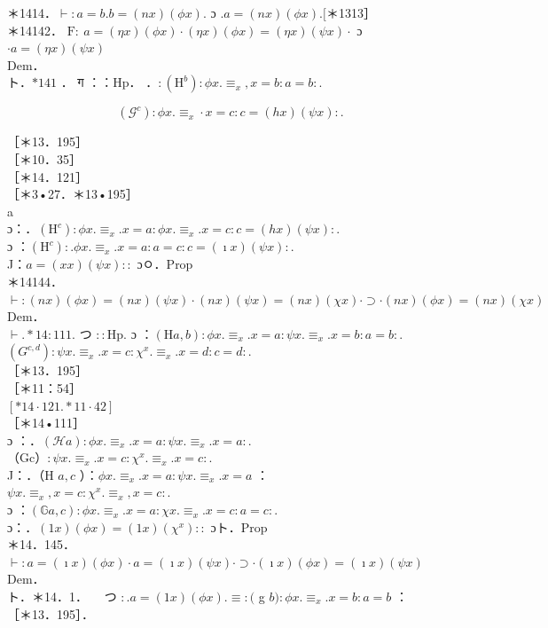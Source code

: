 \documentclass[10pt]{article}
\begin{document}
＊1414．$\vdash: a=b . b=(n x)(\phi x)$. ɔ $. a=(n x)(\phi x) .[$＊1313］\\
＊14142． $\mathrm{F}: ~ a=(\eta x)(\phi x) \cdot(\eta x)(\phi x)=(\eta x)(\psi x) \cdot$ ɔ $\cdot a=(\eta x)(\psi x)$\\
Dem．\\
ト．$* 141$ ． ग ：：Hp． ．$:\left(\mathrm{H}^{b}\right): \phi x . \equiv_{x}, x=b: a=b:$.

$$
\left(\mathcal{G}^{c}\right): \phi x . \equiv_{x} \cdot x=c: c=(h x)(\psi x): .
$$

［＊13．195］\\
［＊10．35］\\
［＊14．121］\\
［＊3•27．＊13•195］\\
a\\
ɔ：．$\left(\mathrm{H}^{c}\right): \phi x . \equiv_{x} . x=a: \phi x . \equiv_{x} . x=c: c=(h x)(\psi x):$.\\
ɔ ：$\left(\mathrm{H}^{c}\right): . \phi x . \equiv_{x} . x=a: a=c: c=(\imath x)(\psi x):$.\\
J：$a=(x x)(\psi x)::$ ɔㅇ．Prop\\
＊14144．$\vdash:(n x)(\phi x)=(n x)(\psi x) \cdot(n x)(\psi x)=(n x)(\chi x) \cdot \supset \cdot(n x)(\phi x)=(n x)(\chi x)$\\
Dem．\\
$\vdash . * 14: 111$. つ $:: \mathrm{Hp}$. ɔ ：$(\mathrm{H} a, b): \phi x . \equiv_{x} . x=a: \psi x . \equiv_{x} . x=b: a=b:$.\\
$\left(G^{c, d}\right): \psi x . \equiv_{x} . x=c: \chi^{x} . \equiv_{x} . x=d: c=d:$.\\
［＊13．195］\\
［＊11：54］\\
$[* 14 \cdot 121 . * 11 \cdot 42]$\\
［＊14•111］\\
ɔ ：．$(\mathcal{H} a): \phi x . \equiv_{x} . x=a: \psi x . \equiv_{x} . x=a:$.\\
（Gc）$: \psi x . \equiv_{x} . x=c: \chi^{x} . \equiv_{x} . x=c:$.\\
J：．（H $a, c$ ）：$\phi x . \equiv_{x} . x=a: \psi x . \equiv_{x} . x=a$ ：\\
$\psi x . \equiv_{x}, x=c: \chi^{x} . \equiv_{x}, x=c:$.\\
ɔ ：$(\mathbb{G} a, c): \phi x . \equiv_{x} . x=a: \chi x . \equiv_{x} . x=c: a=c:$.\\
ɔ：．$(1 x)(\phi x)=(1 x)\left(\chi^{x}\right)::$ ɔト．Prop\\
＊14．145．$\vdash: a=(\imath x)(\phi x) \cdot a=(\imath x)(\psi x) \cdot \supset \cdot(\imath x)(\phi x)=(\imath x)(\psi x)$\\
Dem．\\
ト．＊14．1．$\quad$ つ $: . a=(1 x)(\phi x) . \equiv:($ g $b): \phi x . \equiv_{x} . x=b: a=b$ ：\\
［＊13．195］．
\end{document}
